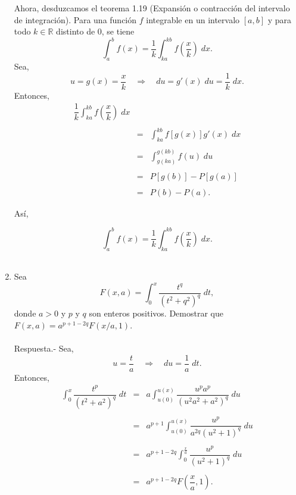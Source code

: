 \begin{enumerate}[\bfseries 1.]
	Ahora, desduzcamos el teorema 1.19 (Expansión o contracción del intervalo de integración). Para una función $f$ integrable en un intervalo $[a,b]$ y para todo $k\in \mathbb{R}$ distinto de $0$, se tiene
	$$\int_a^b f(x)=\dfrac{1}{k}\int_{ka}^{kb}f\left(\dfrac{x}{k}\right)\; dx.$$
	Sea,
	$$u=g(x)=\dfrac{x}{k}\quad \Rightarrow\quad du=g'(x)\; du=\dfrac{1}{k}\; dx.$$
	Entonces,
	$$\begin{array}{rcl}
	    \dfrac{1}{k}\displaystyle\int_{ka}^{kb} f\left(\dfrac{x}{k}\right)\; dx\\\\
	    &=& \displaystyle\int_{ka}^{kb} f\left[g(x)\right]g'(x)\; dx\\\\
	    &=&\displaystyle\int_{g(ka)}^{g(kb)} f(u)\; du\\\\
	    &=&P\left[g(b)\right]-P\left[g(a)\right]\\\\
	    &=& P(b)-P(a).
	\end{array}$$

	Así,

	$$\int_a^b f(x)=\dfrac{1}{k}\int_{ka}^{kb}f\left(\dfrac{x}{k}\right)\; dx.$$\\


    \item Sea
    $$F(x,a)=\int_0^x \dfrac{t^q}{(t^2+q^2)^q}\; dt,$$
    donde $a>0$ y $p$ y $q$ son enteros positivos. Demostrar que $F(x,a)=a^{p+1-2q}F(x/a,1)$.\\\\
	Respuesta.-\; Sea,
	$$u=\dfrac{t}{a}\quad \Rightarrow \quad du=\dfrac{1}{a}\; dt.$$
	Entonces,
	$$\begin{array}{rcl}
	    \displaystyle\int_0^x \dfrac{t^p}{(t^2+a^2)^q}\; dt &=&\displaystyle a\int_{u(0)}^{u(x)} \dfrac{u^p a^p}{(u^2a^2+a^2)^q}\; du\\\\
								&=& \displaystyle a^{p+1} \int_{u(0)}^{u(x)}\dfrac{u^p}{a^{2q}(u^2+1)^q}\; du\\\\
								&=&a^{p+1-2q}\displaystyle\int_0^{\frac{x}{a}} \dfrac{u^p}{(u^2+1)^q}\; du\\\\
								&=&a^{p+1-2q} F\left(\dfrac{x}{a},1\right).
	\end{array}$$
	\vspace{.5cm}


\end{enumerate}
